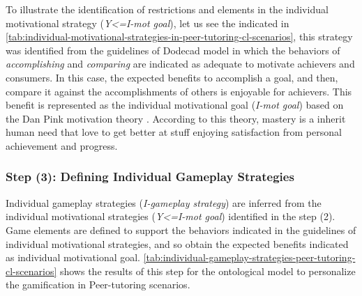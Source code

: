 To illustrate the identification of restrictions and elements in the individual motivational strategy (\emph{Y<=I-mot goal}), let us see the  indicated in \autoref{tab:individual-motivational-strategies-in-peer-tutoring-cl-scenarios}, this strategy was identified from the guidelines of Dodecad model in which the behaviors of \emph{accomplishing} and \emph{comparing} are indicated as adequate to motivate achievers and consumers. In this case, the expected benefits to accomplish a goal, and then, compare it against the accomplishments of others is enjoyable for achievers. This benefit is represented as the individual motivational goal  (\emph{I-mot goal}) based on the Dan Pink motivation theory \cite{Pink2011}. According to this theory, mastery is a inherit human need that love to get better at stuff enjoying satisfaction from personal achievement and progress.
 
\subsubsection*{Step (3): Defining Individual Gameplay Strategies}

Individual gameplay strategies (\emph{I-gameplay strategy}) are inferred from the individual motivational strategies (\emph{Y<=I-mot goal}) identified in the step (2). Game elements are defined to support the behaviors indicated in the guidelines of individual motivational strategies, and so obtain the expected benefits indicated as individual motivational goal. \autoref{tab:individual-gameplay-strategies-peer-tutoring-cl-scenarios} shows the results of this step for the ontological model to personalize the gamification in Peer-tutoring scenarios.

